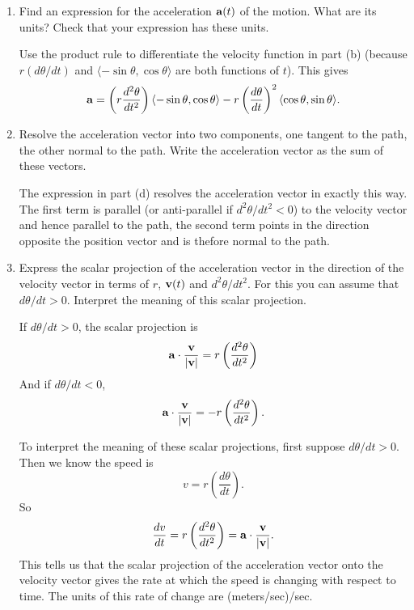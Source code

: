 \documentclass{ximera}
\begin{document}
\begin{question}
\begin{enumerate}
\item Find an expression for the acceleration ${\bf a}(t)$ of the motion. What are its units? Check that your expression has these units.

\begin{expandable}
Use the product rule to differentiate the velocity function in part (b) (because $r (d\theta/dt)$ and $\langle -\sin\theta, \cos\theta\rangle$ are both functions of $t$). This gives
\[
  {\bf a} =  \left( r \frac{d^2\theta}{dt^2} \right) \langle -\sin \theta , \cos\theta \rangle - r \left( \frac{d\theta}{dt} \right)^2 \langle \cos\theta , \sin\theta \rangle .
\]
\end{expandable}


\item Resolve the acceleration vector into two components, one tangent to the path, the other normal to the path. Write the acceleration vector as the sum of these vectors.

\begin{expandable}
The expression in part (d) resolves the acceleration vector in exactly this way. The first term is parallel (or anti-parallel if $d^2\theta/dt^2<0$) to the velocity vector and hence parallel to the path, the second term points in the direction opposite the position vector and is thefore normal to the path.
\end{expandable}

\item Express the scalar projection of the acceleration vector in the direction of the velocity vector in terms of $r$, ${\bf v}(t)$ and $d^2\theta/dt^2$. For this you can assume that $d\theta / dt>0$. Interpret the meaning of this scalar projection.

\begin{expandable}
If $d\theta/dt >0$, the scalar projection is
\[
   {\bf a}\cdot \frac{{\bf v}}{|{\bf v|}} =  r \left( \frac{d^2\theta}{dt^2} \right)
\]
And if $d\theta/dt <0$, 
\[
   {\bf a}\cdot \frac{{\bf v}}{|{\bf v|}} =  - r \left( \frac{d^2\theta}{dt^2} \right) .
\]

To interpret the meaning of these scalar projections, first suppose $d\theta/dt >0$. Then we know the speed is
\[
   v = r \left( \frac{d\theta}{dt} \right) .
\] 
So
\[
  \frac{dv}{dt} = r \left( \frac{d^2\theta}{dt^2} \right) =  {\bf a}\cdot \frac{{\bf v}}{|{\bf v|}} .
\]
This tells us that the scalar projection of the acceleration vector onto the velocity vector gives the rate at which the speed is changing with respect to time. The units of this rate of change are (meters/sec)/sec.


\end{expandable}
\end{enumerate}
\end{question}
\end{document}
